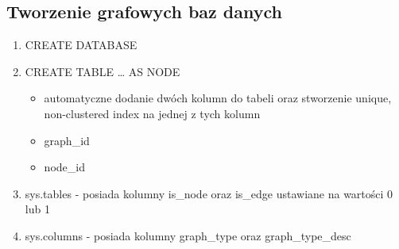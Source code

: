 \documentclass[a4paper]{article}
\begin{document}
    \subsection{Tworzenie grafowych baz danych}
    \begin{enumerate}
        \item CREATE DATABASE
        \item CREATE TABLE … AS NODE
        \begin{itemize}[noitemsep]
            \item automatyczne dodanie dwóch kolumn do tabeli oraz stworzenie unique, non-clustered index na jednej z
            tych kolumn
            \item graph\_id
            \item node\_id
        \end{itemize}
        \item sys.tables - posiada kolumny is\_node oraz is\_edge ustawiane na wartości 0 lub 1
        \item sys.columns - posiada kolumny graph\_type oraz graph\_type\_desc
    \end{enumerate}
\end{document}

